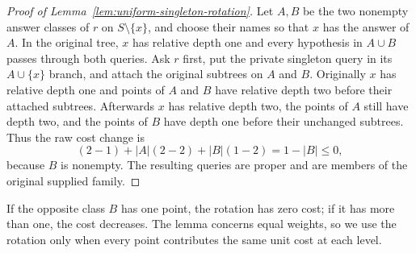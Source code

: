 \begin{proof}[Proof of Lemma~\ref{lem:uniform-singleton-rotation}]
Let $A,B$ be the two nonempty answer classes of $r$ on
$S\setminus\{x\}$, and choose their names so that $x$ has the
answer of $A$. In the original tree, $x$ has relative depth one
and every hypothesis in $A\cup B$ passes through both queries.
Ask $r$ first, put the private singleton query in its
$A\cup\{x\}$ branch, and attach the original subtrees on $A$ and
$B$. Originally $x$ has relative depth one and points of $A$ and $B$
have relative depth two before their attached subtrees. Afterwards
$x$ has relative depth two, the points of $A$ still have depth two,
and the points of $B$ have depth one before their unchanged subtrees.
Thus the raw cost change is
\[
 (2-1)+|A|(2-2)+|B|(1-2)=1-|B|\le0,
\]
because $B$ is nonempty. The resulting queries are
proper and are members of the original supplied family.
\end{proof}

If the opposite class $B$ has one point, the rotation has zero cost;
if it has more than one, the cost decreases. The lemma concerns
equal weights, so we use the rotation only when every point contributes
the same unit cost at each level.

